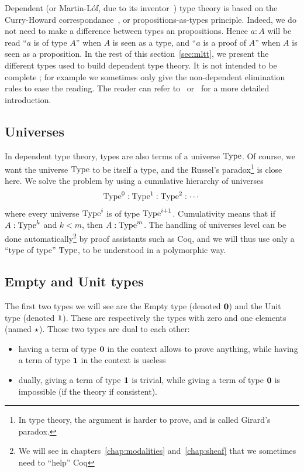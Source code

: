 Dependent (or Martin-L\'of, due to its inventor~\cite{mltt}) type
theory is based on the Curry-Howard correspondance~\cite{Howard80}, or
propositions-as-types principle. Indeed, we do not need to make a
difference between types an propositions. Hence $a:A$ will be read
``$a$ is of type $A$'' when $A$ is seen as a type, and ``$a$ is a
proof of $A$'' when $A$ is seen as a proposition. In the rest of this
section~\ref{sec:mltt}, we present the different types used to build
dependent type theory. It is not intended to be complete ; for example
we sometimes only give the non-dependent elimination rules to ease the
reading. The reader
can refer to~\cite{nordstrom2001martin} or~\cite{hottbook} for a more
detailed introduction.


\subsection{Universes}
\label{ssec:universes}
In dependent type theory, types are also terms of a universe
$\operatorname{Type}$. Of course, we want the universe $\operatorname{Type}$ to be itself a type,
and the Russel's paradox\footnote{In type theory, the argument is
  harder to prove, and is called Girard's paradox.} is close here.
We solve the problem by using a cumulative hierarchy of universes
\[ \operatorname{Type}^0 : \operatorname{Type}^1 : \operatorname{Type}^2 :\cdots \]
where every universe $\operatorname{Type}^i$ is of type $\operatorname{Type}^{i+1}$. Cumulativity means
that if $A:\operatorname{Type}^k$ and $k<m$, then $A:\operatorname{Type}^m$. The handling of
universes level can be done automatically\footnote{We will see in
  chapters~\ref{chap:modalities} and~\ref{chap:sheaf} that we
  sometimes need to ``help'' Coq}
 by proof assistants such as Coq,
and we will thus use only a ``type of type'' $\operatorname{Type}$, to be understood
in a polymorphic way.

\subsection{Empty and Unit types}
\label{ssec:unit_empty}

The first two types we will see are the Empty type (denoted
$\mathbf{0}$) and the Unit type (denoted
$\mathbf{1}$).
These are respectively the types with zero and one elements (named $\star$). Those two
types are dual to each other:
\begin{itemize}
\item having a term of type $\mathbf{0}$ in the context allows to prove
  anything, while having a term of type $\mathbf{1}$ in the context is
  useless
\item dually, giving a term of type $\mathbf{1}$ is trivial, while giving a
  term of type $\mathbf{0}$ is impossible (if the theory if consistent).
\end{itemize}

